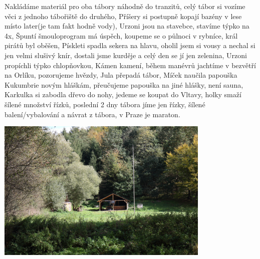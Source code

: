 Nakládáme materiál pro oba tábory náhodně do tranzitů, celý tábor si vozíme věci z jednoho tábořiště do druhého, Příšery si postupně kopají bazény v lese místo later(je tam fakt hodně vody), Urzoni jsou na stavebce, stavíme týpko na 4x, Špuntí šmouloprogram má úspěch, koupeme se o půlnoci v rybníce, král pirátů byl oběšen, Pískleti spadla sekera na hlavu, oholil jsem si vousy a nechal si jen velmi slušivý knír, dostali jsme kurděje a celý den se jí jen zelenina, Urzoni propíchli týpko chlopňovkou, Kámen kamení, během manévrů jachtíme v bezvětří na Orlíku, pozorujeme hvězdy, Jula přepadá tábor, Míček naučila papouška Kukumbrie novým hláškám, přeučujeme papouška na jiné hlášky, není sauna, Karkulka si zabodla dřevo do nohy, jedeme se koupat do Vltavy, holky smaží šílené množství řízků, poslední 2 dny tábora jíme jen řízky, šílené balení/vybalování a návrat z tábora, v Praze je maraton. 

\begin{center}

\includegraphics[width=10.2cm]{img/udo_clanky/hledanitaboriste.JPG}

\end{center}


\clearpage
